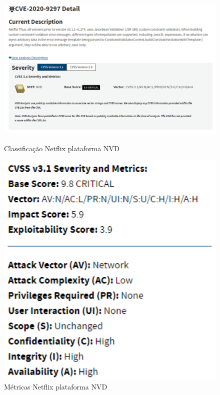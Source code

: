 \documentclass[11t]{article}
\begin{document}
\begin{figure}[H]
    \centering
    \begin{minipage}{0.62\textwidth}
        \centering
        \includegraphics[width=1\textwidth]{images/classificacaoNetflix.png}
        \caption{Classificação Netflix plataforma NVD}
    \end{minipage}
    \hfill
    \begin{minipage}{0.36\textwidth}
        \centering
        \includegraphics[width=1\textwidth]{images/metricasNetflix.png}
        \caption{Métricas Netflix plataforma NVD}
    \end{minipage}
\end{figure}
\end{document}
